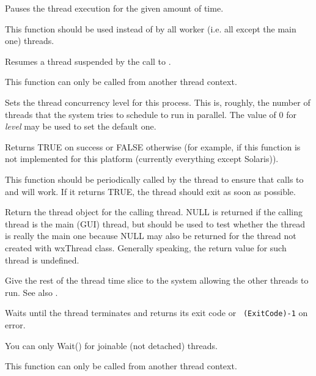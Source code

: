 Pauses the thread execution for the given amount of time.

This function should be used instead of  by all worker
(i.e. all except the main one) threads.

\label{wxthreadresume}


Resumes a thread suspended by the call to .

This function can only be called from another thread context.

\label{wxthreadsetconcurrency}


Sets the thread concurrency level for this process. This is, roughly, the
number of threads that the system tries to schedule to run in parallel.
The value of $0$ for {\it level} may be used to set the default one.

Returns TRUE on success or FALSE otherwise (for example, if this function is
not implemented for this platform (currently everything except Solaris)).

\label{wxthreadtestdestroy}


This function should be periodically called by the thread to ensure that calls
to  and  will
work. If it returns TRUE, the thread should exit as soon as possible.

\label{wxthreadthis}


Return the thread object for the calling thread. NULL is returned if the calling thread
is the main (GUI) thread, but  should be used to test
whether the thread is really the main one because NULL may also be returned for the thread
not created with wxThread class. Generally speaking, the return value for such thread
is undefined.

\label{wxthreadyield}


Give the rest of the thread time slice to the system allowing the other threads to run.
See also .

\label{wxthreadwait}


Waits until the thread terminates and returns its exit code or {\tt
(ExitCode)-1} on error.

You can only Wait() for joinable (not detached) threads.

This function can only be called from another thread context.

